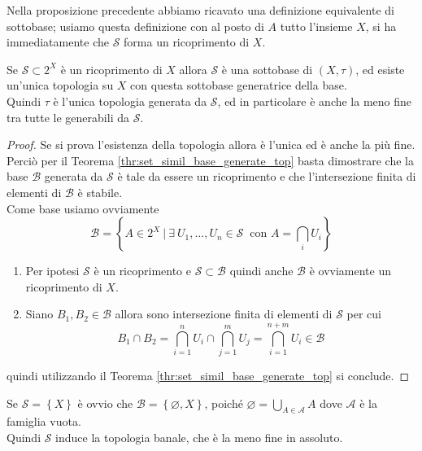 \begin{remark}
	Nella proposizione precedente abbiamo ricavato una definizione equivalente di sottobase; usiamo questa definizione con al posto di $A$ tutto l'insieme $X$, si ha immediatamente che $\mathcal{S}$ forma un ricoprimento di $X$.
\end{remark}

\begin{proposition}
	Se $\mathcal{S} \subset 2^X$ è un ricoprimento di $X$ allora $\mathcal{S}$ è una sottobase di $(X,\tau)$, ed esiste un'unica topologia su $X$ con questa sottobase generatrice della base. \\ Quindi $\tau$ è l'unica topologia generata da $\mathcal{S}$, ed in particolare è anche la meno fine tra tutte le generabili da $\mathcal{S}$.
\end{proposition}
\begin{proof}
	Se si prova l'esistenza della topologia allora è l'unica ed è anche la più fine.
	Perciò per il Teorema \ref{thr:set_simil_base_generate_top} basta dimostrare che la base $\mathcal{B}$ generata da $\mathcal{S}$ è tale da essere un ricoprimento e che l'intersezione finita di elementi di $\mathcal{B}$ è stabile.\\
	Come base usiamo ovviamente
	\begin{equation*}
	\mathcal{B} = \left\{ A \in 2^X \ \Big|\ \exists \ U_1, \dots, U_n \in \mathcal{S} \ \text{ con } A = \bigcap_{i } U_i \right\}
	\end{equation*}
	\begin{enumerate}
		\item Per ipotesi $\mathcal{S}$ è un ricoprimento e $\mathcal{S} \subset \mathcal{B}$ quindi anche $\mathcal{B}$ è ovviamente un ricoprimento di $X$.
		\item Siano $B_1, B_2 \in \mathcal{B}$ allora sono intersezione finita di elementi di $\mathcal{S}$ per cui
		\begin{equation*}
			B_1 \cap B_2 = \bigcap^n_{i=1} U_i \cap \bigcap^{m}_{j=1} U_j = \bigcap^{n+m}_{i=1} U_i  \in \mathcal{B}
		\end{equation*}
	\end{enumerate}
	quindi utilizzando il Teorema \ref{thr:set_simil_base_generate_top} si conclude.
	\end{proof}

\begin{remark}
	Se $\mathcal{S} = \left\{X\right\}$ è ovvio che $\mathcal{B} = \left\{\varnothing, X\right\}$, poiché $\varnothing = \bigcup_{A \in \mathcal{A}} A $ dove $\mathcal{A}$ è la famiglia vuota. \\ Quindi $\mathcal{S}$ induce la topologia banale, che è la meno fine in assoluto.
\end{remark}



